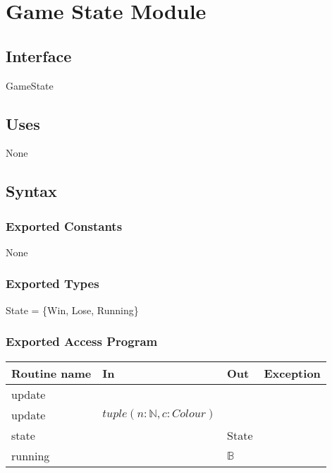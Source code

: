 \documentclass[11pt]{article}
\begin{document}
\section{Game State Module}
\label{sec:org6e446e6}

\subsection*{Interface}
\label{sec:orgba79356}
GameState

\subsection*{Uses}
\label{sec:org25e1bf8}
None

\subsection*{Syntax}
\label{sec:org9ca676a}
\subsubsection*{Exported Constants}
\label{sec:orgb264fe0}
None

\subsubsection*{Exported Types}
\label{sec:orgd6a07a2}
State = \{Win, Lose, Running\}

\subsubsection*{Exported Access Program}
\label{sec:org8aafb6e}
\begin{center}
\begin{tabular}{l|l|l|l}
Routine name & In & Out & Exception\\
\hline
update &  &  & \\
update & \(tuple(n:\mathbb{N}, c: Colour)\) &  & \\
state &  & State & \\
running &  & \(\mathbb{B}\) & \\
\end{tabular}
\end{center}
\end{document}
